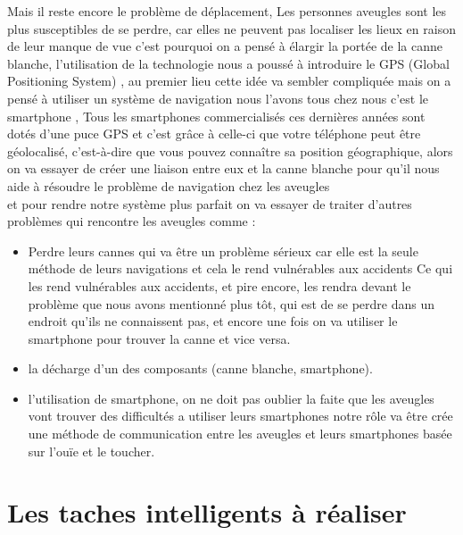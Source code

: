 Mais il reste encore le problème de déplacement, Les personnes aveugles sont les plus susceptibles de se perdre, car elles ne peuvent pas localiser les lieux en raison de leur manque de vue c’est pourquoi on a pensé à élargir la portée de la canne blanche, l’utilisation de la technologie nous a poussé à  introduire le GPS (Global Positioning System) , au premier lieu cette idée va sembler compliquée mais on a pensé à utiliser un système de navigation nous l’avons tous chez nous c’est le smartphone , Tous les smartphones commercialisés ces dernières années sont dotés d'une puce GPS et c'est grâce à celle-ci que votre téléphone peut être géolocalisé, c'est-à-dire que vous pouvez connaître sa position géographique, alors on va essayer de créer une liaison entre eux et la canne blanche pour qu’il nous aide à résoudre le problème de navigation chez les aveugles \\et pour rendre notre système plus parfait on va essayer de traiter d’autres problèmes qui rencontre les aveugles comme :
\begin{itemize}
    \item Perdre leurs cannes qui va être un problème sérieux car elle est la seule méthode de leurs navigations et cela le rend vulnérables aux accidents Ce qui les rend vulnérables aux accidents, et pire encore, les rendra devant le problème que nous avons mentionné plus tôt, qui est de se perdre dans un endroit qu'ils ne connaissent pas, et encore une fois on va utiliser le smartphone pour trouver la canne et vice versa. 
    \item la décharge d’un des composants (canne blanche, smartphone). 
    \item l’utilisation de smartphone, on ne doit pas oublier la faite que les aveugles vont trouver des difficultés a utiliser leurs smartphones notre rôle va être crée une méthode de communication entre les aveugles et leurs smartphones basée sur l’ouïe et le toucher.
\end{itemize}

\section{Les taches intelligents à réaliser}

